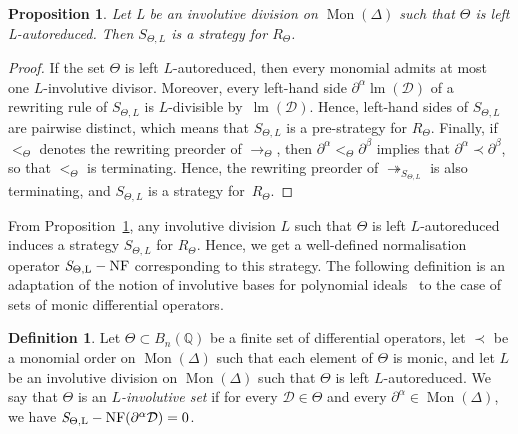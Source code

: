 \documentclass[11pt]{article}
\newtheorem{proposition}[theorem]{Proposition}
\theoremstyle{definition}
\newtheorem{definition}[theorem]{Definition}
\newcommand\D{\mathcal{D}}
\DeclareMathOperator{\lm}{lm}
\newcommand\Q{\mathbb{Q}}
\newcommand\Weyl[1]{B_{#1}(\Q)}
\newcommand\monBasis{\Mon(\Delta)}
\DeclareMathOperator{\Mon}{Mon}
\newcommand\rewTheta{\to_\Theta}
\newcommand\RTheta{R_{\Theta}}
\newcommand\SThetaL{S_{\Theta,L}}
\DeclareMathOperator{\SThetaLNF}{{\it S}_{\Theta,L}-NF}
\begin{document}
\begin{proposition}\label{prop:involutive_strategy}
  Let L be an involutive division on $\Mon(\Delta)$ such that $\Theta$ is
  left L-autoreduced. Then $\SThetaL$ is a strategy for $\RTheta$.  
\end{proposition}

\begin{proof}
  If the set $\Theta$ is left $L$-autoreduced, then every monomial admits
  at most one $L$-involutive divisor. Moreover, every left-hand side
  $\partial^\alpha\lm(\D)$ of a rewriting rule of $\SThetaL$ is
  $L$-divisible by~$\lm(\D)$. Hence, left-hand sides of $\SThetaL$ are
  pairwise distinct, which means that $\SThetaL$ is a pre-strategy for
  $\RTheta$. Finally, if $<_\Theta$ denotes the rewriting preorder of
  $\rewTheta$, then $\partial^\alpha<_\Theta\partial^\beta$ implies that
  $\partial^\alpha\prec\partial^\beta$, so that $<_\Theta$ is
  terminating. Hence, the rewriting preorder of $\twoheadrightarrow_{\SThetaL}$ is also
  terminating, and $\SThetaL$ is a strategy for~$\RTheta$.
\end{proof}
\smallskip


From Proposition~\ref{prop:involutive_strategy}, any involutive division
$L$ such that $\Theta$ is left $L$-autoreduced induces a strategy
$\SThetaL$ for $\RTheta$. Hence, we get a well-defined normalisation
operator $\SThetaLNF$ corresponding to this strategy. The following
definition is an adaptation of the notion of involutive bases for
polynomial ideals~\cite{MR1627129} to the case of sets of monic
differential operators.
\smallskip

\begin{definition}
  Let $\Theta\subset\Weyl{n}$ be a finite set of differential operators,
  let $\prec$ be a monomial order on $\monBasis$ such that each element
  of $\Theta$ is monic, and let $L$ be an involutive division on
  $\Mon(\Delta)$ such that $\Theta$ is left $L$-autoreduced. We say that
  $\Theta$ is an {\em $L$-involutive set} if for every $\D\in\Theta$ and every
  $\partial^\alpha\in\Mon(\Delta)$, we have
  $\SThetaLNF(\partial^\alpha\D)=0$. 
\end{definition}
\smallskip
\end{document}
